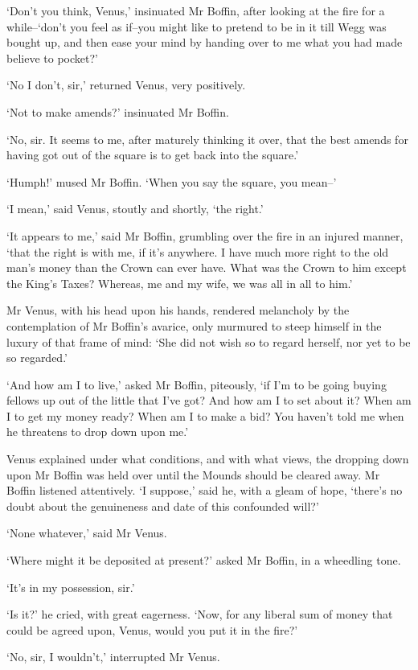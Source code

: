 ‘Don’t you think, Venus,’ insinuated Mr Boffin, after looking at the
fire for a while--‘don’t you feel as if--you might like to pretend to be
in it till Wegg was bought up, and then ease your mind by handing over
to me what you had made believe to pocket?’

‘No I don’t, sir,’ returned Venus, very positively.

‘Not to make amends?’ insinuated Mr Boffin.

‘No, sir. It seems to me, after maturely thinking it over, that the best
amends for having got out of the square is to get back into the square.’

‘Humph!’ mused Mr Boffin. ‘When you say the square, you mean--’

‘I mean,’ said Venus, stoutly and shortly, ‘the right.’

‘It appears to me,’ said Mr Boffin, grumbling over the fire in an
injured manner, ‘that the right is with me, if it’s anywhere. I have
much more right to the old man’s money than the Crown can ever have.
What was the Crown to him except the King’s Taxes? Whereas, me and my
wife, we was all in all to him.’

Mr Venus, with his head upon his hands, rendered melancholy by the
contemplation of Mr Boffin’s avarice, only murmured to steep himself
in the luxury of that frame of mind: ‘She did not wish so to regard
herself, nor yet to be so regarded.’

‘And how am I to live,’ asked Mr Boffin, piteously, ‘if I’m to be going
buying fellows up out of the little that I’ve got? And how am I to set
about it? When am I to get my money ready? When am I to make a bid? You
haven’t told me when he threatens to drop down upon me.’

Venus explained under what conditions, and with what views, the dropping
down upon Mr Boffin was held over until the Mounds should be cleared
away. Mr Boffin listened attentively. ‘I suppose,’ said he, with a
gleam of hope, ‘there’s no doubt about the genuineness and date of this
confounded will?’

‘None whatever,’ said Mr Venus.

‘Where might it be deposited at present?’ asked Mr Boffin, in a
wheedling tone.

‘It’s in my possession, sir.’

‘Is it?’ he cried, with great eagerness. ‘Now, for any liberal sum of
money that could be agreed upon, Venus, would you put it in the fire?’

‘No, sir, I wouldn’t,’ interrupted Mr Venus.

